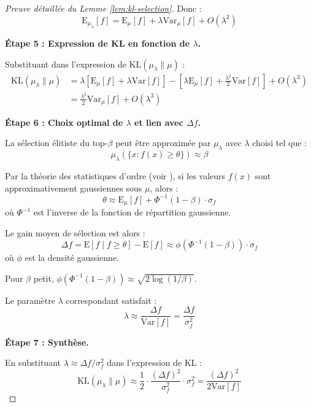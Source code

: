 \documentclass[12pt,a4paper]{article}
\theoremstyle{definition}
\theoremstyle{remark}
\newcommand{\E}{\text{E}}
\newcommand{\Var}{\text{Var}}
\newcommand{\KL}{\text{KL}}
\begin{document}
\begin{proof}[Preuve détaillée du Lemme \ref{lem:kl-selection}]
Donc :
\begin{equation}
	\E_{\mu_\lambda}[f] = \E_\mu[f] + \lambda \Var_\mu[f] + O(\lambda^2)
\end{equation}

\textbf{Étape 5 : Expression de KL en fonction de $\lambda$.}

Substituant dans l'expression de $\KL(\mu_\lambda \| \mu)$ :
\begin{align}
	\KL(\mu_\lambda \| \mu) &= \lambda[\E_\mu[f] + \lambda \Var[f]] - [\lambda \E_\mu[f] + \frac{\lambda^2}{2}\Var[f]] + O(\lambda^3) \\
	&= \frac{\lambda^2}{2}\Var_\mu[f] + O(\lambda^3)
\end{align}

\textbf{Étape 6 : Choix optimal de $\lambda$ et lien avec $\Delta f$.}

La sélection élitiste du top-$\beta$ peut être approximée par $\mu_\lambda$ avec $\lambda$ choisi tel que :
\begin{equation}
	\mu_\lambda(\{x : f(x) \geq \theta\}) \approx \beta
\end{equation}

Par la théorie des statistiques d'ordre (voir \cite{david2003order}), si les valeurs $f(x)$ sont approximativement gaussiennes sous $\mu$, alors :
\begin{equation}
	\theta \approx \E_\mu[f] + \Phi^{-1}(1-\beta) \cdot \sigma_f
\end{equation}
où $\Phi^{-1}$ est l'inverse de la fonction de répartition gaussienne.

Le gain moyen de sélection est alors :
\begin{equation}
	\Delta f = \E[f \mid f \geq \theta] - \E[f] \approx \phi(\Phi^{-1}(1-\beta)) \cdot \sigma_f
\end{equation}
où $\phi$ est la densité gaussienne.

Pour $\beta$ petit, $\phi(\Phi^{-1}(1-\beta)) \approx \sqrt{2\log(1/\beta)}$.

Le paramètre $\lambda$ correspondant satisfait :
\begin{equation}
	\lambda \approx \frac{\Delta f}{\Var[f]} = \frac{\Delta f}{\sigma_f^2}
\end{equation}

\textbf{Étape 7 : Synthèse.}

En substituant $\lambda \approx \Delta f / \sigma_f^2$ dans l'expression de KL :
\begin{equation}
	\KL(\mu_\lambda \| \mu) \approx \frac{1}{2} \cdot \frac{(\Delta f)^2}{\sigma_f^2} \cdot \sigma_f^2 = \frac{(\Delta f)^2}{2\Var[f]}
\end{equation}


\end{proof}
\end{document}
